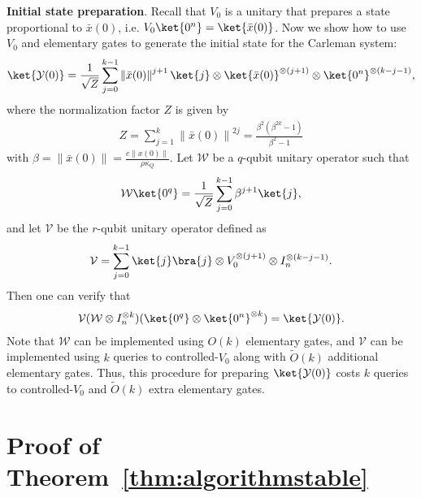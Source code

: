 \documentclass[superscriptaddress,onecolumn,nofootinbib,longbibliography,a4paper,accepted=2026-09-29]{quantumarticle}
\theoremstyle{plain}
\theoremstyle{definition}
\numberwithin{thm}{section}
\numberwithin{assumption}{section}
\numberwithin{lemma}{section}
\numberwithin{prop}{section}
\numberwithin{cor}{section}
\numberwithin{definition}{section}
\numberwithin{rmk}{section}
\numberwithin{equation}{section}
\newcommand{\norm}[1]     {\left\| #1 \right\|}
\newcommand{\lrb}[1]{\left ( #1 \right )}
\newcommand{\myO}[1]{O\lrb{#1}}
\newcommand{\mytO}[1]{\tilde{O}\lrb{#1}}
\begin{document}
\noindent\textbf{Initial state preparation}.
Recall that $V_0$ is a unitary that prepares a state proportional to $\bar{x}(0)$, i.e. 
$V_0\ket{0^n}=\ket{\bar{x}(0)}$. Now we show how to use $V_0$ and elementary gates to generate the initial state for the Carleman system:
\begin{align}
\ket{\mathcal{Y}(0)} 
=\frac{1}{\sqrt{Z}}\sum_{j=0}^{k-1}  \norm{\bar{x}(0)}^{j+1}\ket{j} \otimes \ket{\bar{x}(0)}^{\otimes (j+1)} \otimes \ket{0^n}^{\otimes (k-j-1)},
\end{align}
where the normalization factor $Z$ is given by
\begin{align}
Z = \sum_{j=1}^k \norm{\bar{x}(0)}^{2j}
=  \frac{\beta^2(\beta^{2k}-1)}{\beta^2-1}
\end{align}
with $\beta=\norm{\bar{x}(0)}=\frac{c\norm{x(0)}}{\rho \kappa_Q}$.  Let $\mathcal{W}$ be a $q$-qubit unitary operator such that
\begin{align}
    \mathcal{W}\ket{0^q}=\frac{1}{\sqrt{Z}}\sum_{j=0}^{k-1} \beta^{j+1}\ket{j},
\end{align}
and let $\mathcal{V}$ be the $r$-qubit unitary operator defined as
\begin{align}
    \mathcal{V}=\sum_{j=0}^{k-1} \ket{j}\bra{j}\otimes V_0^{\otimes (j+1)} \otimes I_n^{\otimes (k-j-1)}.
\end{align}
Then one can verify that
\begin{align}
    \mathcal{V}(\mathcal{W} \otimes I_n^{\otimes k})(\ket{0^q}\otimes \ket{0^n}^{\otimes k}) = \ket{\mathcal{Y}(0)}.
\end{align}
Note that $\mathcal{W}$ can be implemented using $\myO{k}$ elementary gates, and $\mathcal{V}$ can be implemented using $k$ queries to controlled-$V_0$ along with $\mytO{k}$ additional elementary gates. Thus, this procedure for preparing $\ket{\mathcal{Y}(0)}$ costs $k$ queries to controlled-$V_0$ and $\mytO{k}$ extra elementary gates.


\section{Proof of Theorem~\ref{thm:algorithmstable}}
\label{app:proof_thm_algorithmstable}
\end{document}
